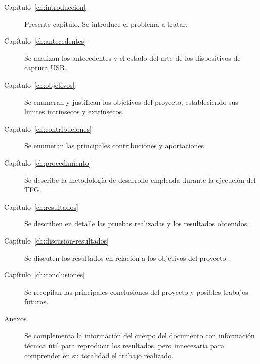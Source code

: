\begin{description}
    \item[Capítulo~\ref{ch:introduccion}] Presente capitulo. Se introduce el problema a tratar.
    \item[Capítulo~\ref{ch:antecedentes}] Se analizan los antecedentes y el estado del arte de los dispositivos de captura USB.
    \item[Capítulo~\ref{ch:objetivos}] Se enumeran y justifican los objetivos del proyecto, estableciendo sus limites intrínsecos y extrínsecos.
    \item[Capítulo~\ref{ch:contribuciones}] Se enumeran las principales contribuciones y aportaciones %
    \item[Capítulo~\ref{ch:procedimiento}] Se describe la metodología de desarrollo empleada durante la ejecución del TFG.
    \item[Capítulo~\ref{ch:resultados}] Se describen en detalle las pruebas realizadas y los resultados obtenidos.
    \item[Capítulo~\ref{ch:discusion-resultados}] Se discuten los resultados en relación a los objetivos del proyecto. %
    \item[Capítulo~\ref{ch:conclusiones}] Se recopilan las principales conclusiones del proyecto y posibles trabajos futuros.
    \item[Anexos] Se complementa la información del cuerpo del documento con información técnica útil para reproducir los resultados, pero innecesaria para comprender en su totalidad el trabajo realizado.
\end{description}

